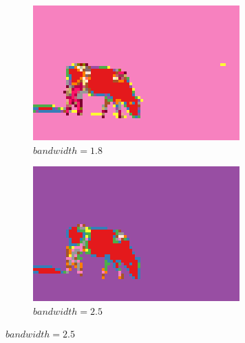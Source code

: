 \documentclass[10pt,a4paper,twoside]{article}
\newcommand{\sweepsize}{0.3}
\begin{document}
\begin{figure}[h]
    \centering

    \begin{subfigure}{\sweepsize\textwidth}
    \includegraphics[width=0.9\linewidth]{result_1.8.png} 
    \caption{$bandwidth=1.8$}
    \end{subfigure}
    \begin{subfigure}{\sweepsize\textwidth}
    \includegraphics[width=0.9\linewidth]{result_2.5.png} 
    \caption{$bandwidth=2.5$}
    \end{subfigure}
    

\end{figure}
\end{document}
